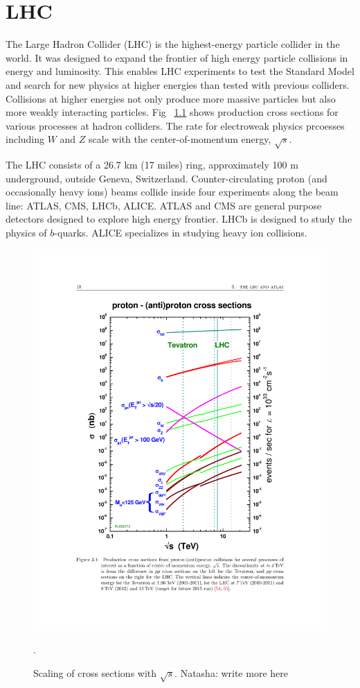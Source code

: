 \label{ch:detector}
\chapter{LHC}
The Large Hadron Collider (LHC) is the highest-energy particle collider in the world. It was designed to expand the frontier of high energy particle collisions in energy and luminosity. This enables LHC experiments to test the Standard Model and search for new physics at higher energies than tested with previous colliders. Collisions at higher energies not only produce more massive particles but also more weakly interacting particles. Fig ~\ref{fig:xs_scaling} shows production cross sections for various processes at hadron colliders. The rate for electroweak physics prcoesses including $W$ and $Z$ scale with the center-of-momentum energy, $\sqrt{s}$.

The LHC consists of a 26.7 km (17 miles) ring, approximately 100 m underground, outside Geneva, Switzerland. Counter-circulating proton (and occasionally heavy ions) beams collide inside four experiments along the beam line: ATLAS, CMS, LHCb, ALICE. ATLAS and CMS are general purpose detectors designed to explore high energy frontier. LHCb is designed to study the physics of $b$-quarks. ALICE specializes in studying heavy ion collisions. 


\begin{figure}[h!]
  \centering
  \includegraphics[width=\hsize]{figures/Detector/xs_scaling.pdf}
  \caption{Scaling of cross sections with $\sqrt{s}$. Natasha: write more here}. 
  \label{fig:xs_scaling}
\end{figure}
\FloatBarrier


